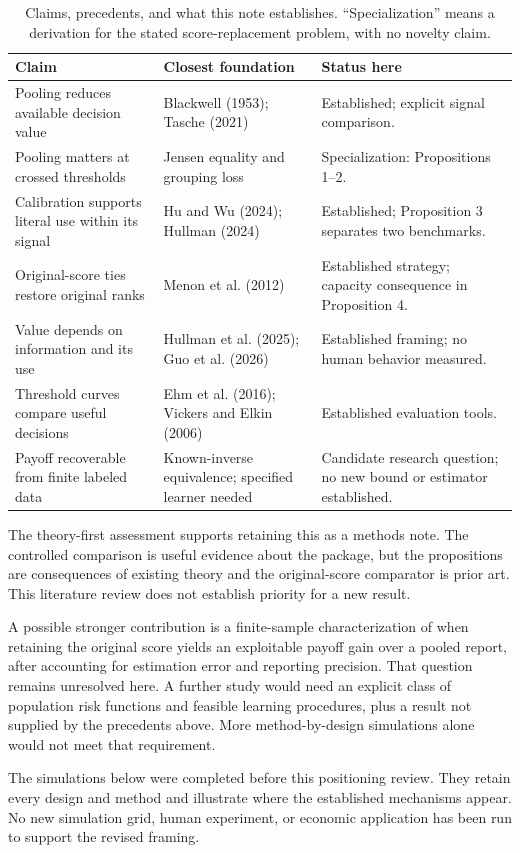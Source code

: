 \begin{table}[ht]
\caption{Claims, precedents, and what this note establishes. ``Specialization'' means a derivation for the stated score-replacement problem, with no novelty claim.}
\label{tab:precedent}
\small\renewcommand{\arraystretch}{1.2}
\begin{tabular}{p{.23\linewidth}p{.34\linewidth}p{.34\linewidth}}
\toprule Claim & Closest foundation & Status here\\\midrule
Pooling reduces available decision value & Blackwell (1953); Tasche (2021) & Established; explicit signal comparison.\\
Pooling matters at crossed thresholds & Jensen equality and grouping loss & Specialization: Propositions 1--2.\\
Calibration supports literal use within its signal & Hu and Wu (2024); Hullman (2024) & Established; Proposition 3 separates two benchmarks.\\
Original-score ties restore original ranks & Menon et al. (2012) & Established strategy; capacity consequence in Proposition 4.\\
Value depends on information and its use & Hullman et al. (2025); Guo et al. (2026) & Established framing; no human behavior measured.\\
Threshold curves compare useful decisions & Ehm et al. (2016); Vickers and Elkin (2006) & Established evaluation tools.\\
Payoff recoverable from finite labeled data & Known-inverse equivalence; specified learner needed & Candidate research question; no new bound or estimator established.\\\bottomrule
\end{tabular}
\end{table}

The theory-first assessment supports retaining this as a methods note. The controlled comparison is useful evidence about the package, but the propositions are consequences of existing theory and the original-score comparator is prior art. This literature review does not establish priority for a new result.

A possible stronger contribution is a finite-sample characterization of when retaining the original score yields an exploitable payoff gain over a pooled report, after accounting for estimation error and reporting precision. That question remains unresolved here. A further study would need an explicit class of population risk functions and feasible learning procedures, plus a result not supplied by the precedents above. More method-by-design simulations alone would not meet that requirement.

The simulations below were completed before this positioning review. They retain every design and method and illustrate where the established mechanisms appear. No new simulation grid, human experiment, or economic application has been run to support the revised framing.
\clearpage
